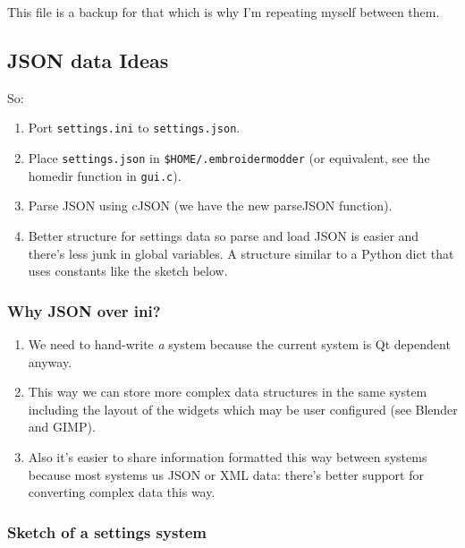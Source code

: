 \documentclass[a4paper, 11pt]{report}
\begin{document}
This file is a backup for that which is why I'm repeating myself between
them.

\hypertarget{json-data-ideas-1}{%
\subsection{JSON data Ideas}\label{json-data-ideas-1}}

So:

\begin{enumerate}
\def\labelenumi{\arabic{enumi}.}
\item
  Port \texttt{settings.ini} to \texttt{settings.json}.
\item
  Place \texttt{settings.json} in \texttt{\$HOME/.embroidermodder} (or
  equivalent, see the homedir function in \texttt{gui.c}).
\item
  Parse JSON using cJSON (we have the new parseJSON function).
\item
  Better structure for settings data so parse and load JSON is easier
  and there's less junk in global variables. A structure similar to a
  Python dict that uses constants like the sketch below.
\end{enumerate}

\hypertarget{why-json-over-ini-1}{%
\subsubsection{Why JSON over ini?}\label{why-json-over-ini-1}}

\begin{enumerate}
\def\labelenumi{\arabic{enumi}.}
\item
  We need to hand-write \emph{a} system because the current system is Qt
  dependent anyway.
\item
  This way we can store more complex data structures in the same system
  including the layout of the widgets which may be user configured (see
  Blender and GIMP).
\item
  Also it's easier to share information formatted this way between
  systems because most systems us JSON or XML data: there's better
  support for converting complex data this way.
\end{enumerate}

\hypertarget{sketch-of-a-settings-system-1}{%
\subsubsection{Sketch of a settings
system}\label{sketch-of-a-settings-system-1}}
\end{document}
